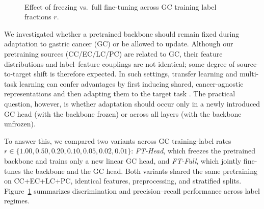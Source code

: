 \documentclass[diagnostics,article,submit,pdftex,moreauthors]{Definitions/mdpi}
\begin{document}
%	
\begin{figure}[htbp]
	\centering
	\\
	\caption{Effect of freezing vs.\ full fine-tuning across GC training label fractions $r$.}
	\label{fig:transfer-combo-gcrate}
\end{figure}
\label{subsec:freeze-vs-full}
We investigated whether a pretrained backbone should remain fixed during adaptation to gastric cancer (GC) or be allowed to update. Although our pretraining sources (CC/EC/LC/PC) are related to GC, their feature distributions and label–feature couplings are not identical; some degree of source-to-target shift is therefore expected. In such settings, transfer learning and multi-task learning can confer advantages by first inducing shared, cancer-agnostic representations and then adapting them to the target task \citep{Caruana1997_MTL,Pan2010_TLsurvey,Yosinski2014_transferable}. The practical question, however, is whether adaptation should occur only in a newly introduced GC head (with the backbone frozen) or across all layers (with the backbone unfrozen).

To answer this, we compared two variants across GC training-label rates $r \in \{1.00, 0.50, 0.20, 0.10, 0.05, 0.02, 0.01\}$: \emph{FT-Head}, which freezes the pretrained backbone and trains only a new linear GC head, and \emph{FT-Full}, which jointly fine-tunes the backbone and the GC head. Both variants shared the same pretraining on CC+EC+LC+PC, identical features, preprocessing, and stratified splits. Figure~\ref{fig:transfer-combo-gcrate} summarizes discrimination and precision–recall performance across label regimes.
\end{document}
